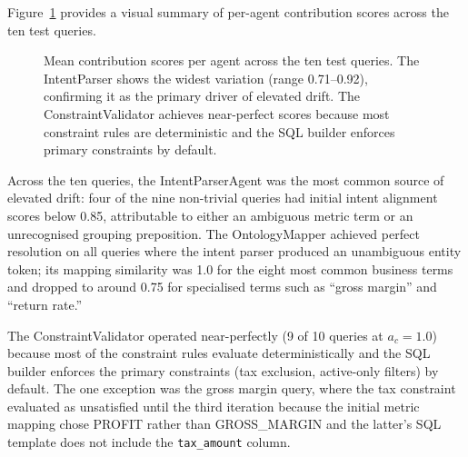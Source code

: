 \documentclass[12pt,a4paper]{report}
\begin{document}
Figure~\ref{fig:agent-scores} provides a visual summary of per-agent contribution scores across the ten test queries.

\begin{figure}[H]
  \centering
  \caption{Mean contribution scores per agent across the ten test queries. The IntentParser shows the widest variation (range 0.71--0.92), confirming it as the primary driver of elevated drift. The ConstraintValidator achieves near-perfect scores because most constraint rules are deterministic and the SQL builder enforces primary constraints by default.}
  \label{fig:agent-scores}
\end{figure}

Across the ten queries, the IntentParserAgent was the most common source of elevated drift: four of the nine non-trivial queries had initial intent alignment scores below 0.85, attributable to either an ambiguous metric term or an unrecognised grouping preposition. The OntologyMapper achieved perfect resolution on all queries where the intent parser produced an unambiguous entity token; its mapping similarity was 1.0 for the eight most common business terms and dropped to around 0.75 for specialised terms such as ``gross margin'' and ``return rate.''

The ConstraintValidator operated near-perfectly (9 of 10 queries at $a_c = 1.0$) because most of the constraint rules evaluate deterministically and the SQL builder enforces the primary constraints (tax exclusion, active-only filters) by default. The one exception was the gross margin query, where the tax constraint evaluated as unsatisfied until the third iteration because the initial metric mapping chose PROFIT rather than GROSS\_MARGIN and the latter's \ac{SQL} template does not include the \texttt{tax\_amount} column.
\end{document}
